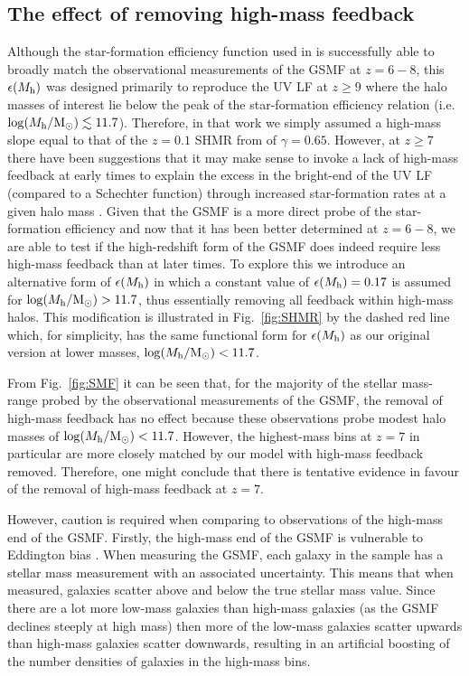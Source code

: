 \documentclass[fleqn,usenatbib]{mnras}
\begin{document}
\subsection{The effect of removing high-mass feedback}
\label{sec:remove_feedback}
Although the star-formation efficiency function used in \citet{donnan2024} is successfully able to broadly match the observational measurements of the GSMF at $z=6-8$, this $\epsilon(M_{\rm h})$ was designed primarily to reproduce the UV LF at $z\geq9$ where the halo masses of interest lie below the peak of the star-formation efficiency relation (i.e. $\log(M_{\rm h}/ \mathrm{M_{\odot}})\lesssim11.7$). Therefore, in that work we simply assumed a high-mass slope equal to that of the $z=0.1$ SHMR from \citet{behroozi2010} of $\gamma = 0.65$. However, at $z\geq7$ there have been suggestions that it may make sense to invoke a lack of high-mass feedback at early times to explain the excess in the bright-end of the UV LF (compared to a Schechter function) through increased star-formation rates at a given halo mass \citep[e.g.][]{bowler2017,bowler2020,stefanon2019}. Given that the GSMF is a more direct probe of the star-formation efficiency and now that it has been better determined at $z=6-8$, we are able to test if the high-redshift form of the GSMF does indeed require 
less high-mass feedback than at later times. To explore this we introduce an alternative form of $\epsilon(M_{\rm h})$ in which a constant value of $\epsilon(M_{\rm h}) = 0.17$ is assumed for $\log(M_{\rm h}/ \mathrm{M_{\odot}})>11.7$, thus essentially removing all feedback within high-mass halos. This modification is illustrated in Fig.~\ref{fig:SHMR} by the dashed red line  which, for simplicity, has the same functional form for $\epsilon(M_{\rm h})$ as our original version at lower masses, $\log(M_{\rm h}/ \mathrm{M_{\odot}})<11.7$.

From Fig.~\ref{fig:SMF} it can be seen that, for the majority of the stellar mass-range probed by the observational measurements of the GSMF, the removal of high-mass feedback has no effect because these observations probe modest halo masses of $\log(M_{\rm h}/ \mathrm{M_{\odot}})<11.7$. However, the highest-mass bins at $z=7$ in particular are more closely matched by our model with high-mass feedback removed. Therefore, one might conclude that there is tentative evidence in favour of the removal of high-mass feedback at $z=7$. 

However, caution is required when comparing to observations of the high-mass end of the GSMF. Firstly, the high-mass end of the GSMF is vulnerable to Eddington bias \citep{eddington1913}. When measuring the GSMF, each galaxy in the sample has a stellar mass measurement with an associated uncertainty. This means that when measured, galaxies scatter above and below the true stellar mass value. Since there are a lot more low-mass galaxies than high-mass galaxies (as the GSMF declines steeply at high mass) then more of the low-mass galaxies scatter upwards than  high-mass galaxies scatter downwards, resulting in an artificial boosting of the number densities of galaxies in the high-mass bins.
\end{document}
